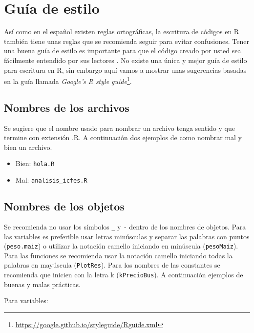 \documentclass[10pt,]{krantz}
\providecommand{\tightlist}{%
  \setlength{\itemsep}{0pt}\setlength{\parskip}{0pt}}
\let\proglang=\textsf
\renewcommand{\href}[2]{#2\footnote{\url{#1}}}
\begin{document}
\chapter{\texorpdfstring{Guía de estilo
}{Guía de estilo }}\label{guia-de-estilo}

Así como en el español existen reglas ortográficas, la escritura de
códigos en \proglang{R} también tiene unas reglas que se recomienda
seguir para evitar confusiones. Tener una buena guía de estilo
 es importante para que el código creado por usted
sea fácilmente entendido por sus lectores \citet{rpackages}. No existe
una única y mejor guía de estilo para escritura en \proglang{R}, sin
embargo aquí vamos a mostrar unas sugerencias basadas en la guía llamada
\href{https://google.github.io/styleguide/Rguide.xml}{\textit{Google's R style guide}}.

\section{Nombres de los archivos}\label{nombres-de-los-archivos}

Se sugiere que el nombre usado para nombrar un archivo tenga sentido y
que termine con extensión .R. A continuación dos ejemplos de como
nombrar mal y bien un archivo.

\begin{itemize}
\tightlist
\item
  Bien: \texttt{hola.R}
\item
  Mal: \texttt{analisis\_icfes.R}
\end{itemize}

\section{Nombres de los objetos}\label{nombres-de-los-objetos}

Se recomienda no usar los símbolos \texttt{\_} y \texttt{-} dentro de
los nombres de objetos. Para las variables es preferible usar letras
minúsculas y separar las palabras con puntos (\texttt{peso.maiz}) o
utilizar la notación camello iniciando en minúscula (\texttt{pesoMaiz}).
Para las funciones se recomienda usar la notación camello iniciando
todas la palabras en mayúscula (\texttt{PlotRes}). Para los nombres de
las constantes se recomienda que inicien con la letra k
(\texttt{kPrecioBus}). A continuación ejemplos de buenas y malas
prácticas.

Para variables:
\end{document}
